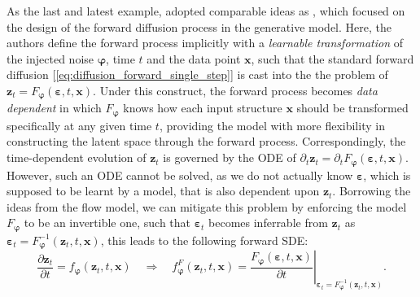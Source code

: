 As the last and latest example, \citet{cornet2024equivariant} adopted comparable ideas as \citet{wu2022diffusion}, which focused on the design of the forward diffusion process in the generative model. Here, the authors define the forward process implicitly with a \emph{learnable transformation} of the injected noise $\boldsymbol{\varphi}$, time $t$ and the data point $\bm{x}$, such that the standard forward diffusion [\cref{eq:diffusion_forward_single_step}] is cast into the the problem of $\bm{z}_t=F_{\boldsymbol{\varphi}}(\boldsymbol{\varepsilon},t,\bm{x})$. Under this construct, the forward process becomes \emph{data dependent} in which $F_{\boldsymbol{\varphi}}$ knows how each input structure $\bm{x}$ should be transformed specifically at any given time $t$, providing the model with more flexibility in constructing the latent space through the forward process. Correspondingly, the time-dependent evolution of $\bm{z}_t$ is governed by the ODE of $\partial_t\bm{z}_t=\partial_t F_{\boldsymbol{\varphi}}(\boldsymbol{\varepsilon},t,\bm{x})$. However, such an ODE cannot be solved, as we do not actually know $\boldsymbol{\varepsilon}$, which is supposed to be learnt by a model, that is also dependent upon $\bm{z}_t$. Borrowing the ideas from the flow model, we can mitigate this problem by enforcing the model $F_{\boldsymbol{\varphi}}$ to be an invertible one, such that $\boldsymbol{\varepsilon}_t$ becomes inferrable from $\bm{z}_t$ as $\boldsymbol{\varepsilon}_t=F^{-1}_{\boldsymbol{\varphi}}(\bm{z}_t,t,\bm{x})$, this leads to the following forward SDE:
\begin{equation}
    \label{eq:forward_ODE_cornet}
    \frac{\partial\bm{z}_t}{\partial t}=f_{\boldsymbol{\varphi}}(\bm{z}_t,t,\bm{x})\quad\Rightarrow\quad f^F_{\boldsymbol{\varphi}}(\bm{z}_t,t,\bm{x})=\left.\frac{F_{\boldsymbol{\varphi}}(\boldsymbol{\varepsilon},t,\bm{x})}{\partial t}\right\vert_{\boldsymbol{\varepsilon}_t=F^{-1}_{\boldsymbol{\varphi}}(\bm{z}_t,t,\bm{x})}.
\end{equation}

